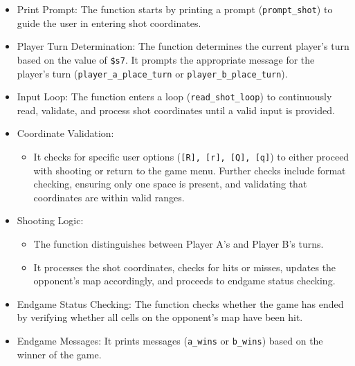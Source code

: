 \begin{enumerate}
    \begin{itemize}
        \item Print Prompt: The function starts by printing a prompt (\texttt{prompt\_shot}) to guide the user in entering shot coordinates.
        \item Player Turn Determination: The function determines the current player's turn based on the value of \texttt{\$s7}. It prompts the appropriate message for the player's turn (\texttt{player\_a\_place\_turn} or \texttt{player\_b\_place\_turn}).
        \item Input Loop: The function enters a loop (\texttt{read\_shot\_loop}) to continuously read, validate, and process shot coordinates until a valid input is provided.
        \item Coordinate Validation:
        \begin{itemize}
            \item It checks for specific user options (\texttt{[R], [r], [Q], [q]}) to either proceed with shooting or return to the game menu.
            Further checks include format checking, ensuring only one space is present, and validating that coordinates are within valid ranges.
        \end{itemize}
        \item Shooting Logic:
        \begin{itemize}
            \item The function distinguishes between Player A's and Player B's turns.
            \item It processes the shot coordinates, checks for hits or misses, updates the opponent's map accordingly, and proceeds to endgame status checking.
        \end{itemize}
        \item Endgame Status Checking: The function checks whether the game has ended by verifying whether all cells on the opponent's map have been hit.
        \item Endgame Messages: It prints messages (\texttt{a\_wins} or \texttt{b\_wins}) based on the winner of the game.
    \end{itemize}

\end{enumerate}